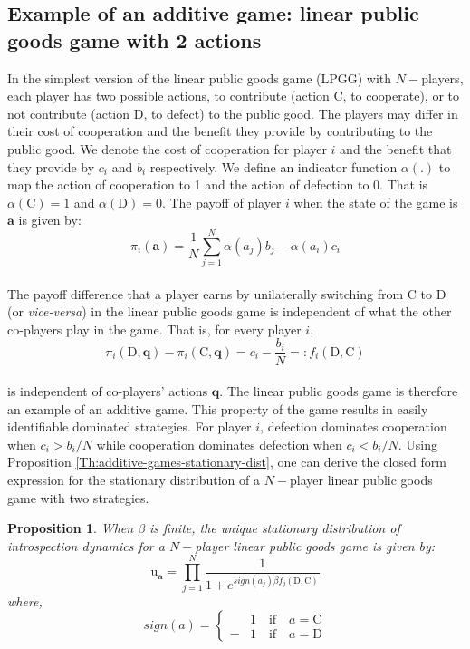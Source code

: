 \documentclass[11pt]{article}
\theoremstyle{plainCl1}
\newtheorem{Prop}{Proposition}
\theoremstyle{plainCl2}
\newcommand{\abf}{\mathbf{a}}
\newcommand{\qbf}{\mathbf{q}}
\newcommand{\C}{\mathrm{C}}
\newcommand{\D}{\mathrm{D}}
\begin{document}
\subsection*{Example of an additive game: linear public goods game with 2 actions}
In the simplest version of the linear public goods game (LPGG) with $N-$players, each player has two possible actions, to contribute (action $\C$, to cooperate), or to not contribute (action $\D$, to defect) to the public good. The players may differ in their cost of cooperation and the benefit they provide by contributing to the public good. We denote the cost of cooperation for player $i$ and the benefit that they provide by $c_i$ and $b_i$ respectively. We define an indicator function $\alpha(.)$ to map the action of cooperation to 1 and the action of defection to 0. That is $\alpha(\C) = 1$ and $\alpha(\D) = 0$.  The payoff of player $i$ when the state of the game is $\abf$ is given by: \\
\begin{equation}
\pi_i(\abf) = \frac{1}{N}\sum_{j=1}^N \displaystyle \alpha(a_j) b_j - \alpha(a_i) c_i
\label{Eq:linear-pgg-payoff}
\end{equation}
\\
\noindent The payoff difference that a player earns by unilaterally switching from $\C$ to $\D$ (or \emph{vice-versa}) in the linear public goods game is independent of what the other co-players play in the game. That is, for every player $i$,
\begin{equation}
\pi_i(\D, \qbf) - \pi_i(\C, \qbf) = c_i - \frac{b_i}{N} =: f_i(\D, \C) 
\label{Eq:difference-payoffs-lpgg}
\end{equation}\\
\noindent is independent of co-players' actions $\qbf$. The linear public goods game is therefore an example of an additive game. This property of the game results in easily identifiable dominated strategies. For player $i$, defection dominates cooperation when $c_i > b_i/N$ while cooperation dominates defection when $c_i < b_i/N$. Using Proposition \ref{Th:additive-games-stationary-dist}, one can derive the closed form expression for the stationary distribution of a $N-$player linear public goods game with two strategies. 
\begin{Prop}
\label{prop:stationary-dist-lpgg}
When $\beta$ is finite, the unique stationary distribution of introspection dynamics for a $N-$player linear public goods game is given by: 
\\
\begin{equation}
\mathrm{u}_\abf = \prod_{j = 1}^{N} \frac{1}{1 + \displaystyle e^{\mathit{sign}(a_j)\beta f_j(\D, \C )}} 
\label{Eq:stationary_dist_lpgg}
\end{equation}
where, 
\begin{equation}
\label{Eq:sign-function}
\mathit{sign}(a) =
\begin{cases}
&1 \quad \text{if} \quad a = \C \\
-&1 \quad \text{if} \quad a = \D
\end{cases}
\end{equation} \\
\end{Prop}
\end{document}
